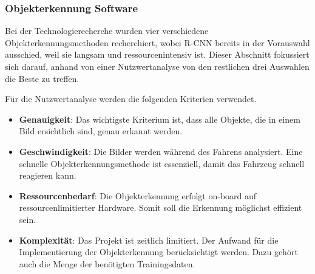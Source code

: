 \documentclass[../main.tex]{subfiles}
\begin{document}
\newpage

\subsubsection{Objekterkennung Software}
\label{a3:Objekterkennung}
Bei der Technologierecherche wurden vier verschiedene Objekterkennungsmethoden recherchiert, wobei R-CNN bereits in der Vorauswahl ausschied, weil sie langsam und ressourcenintensiv ist.
Dieser Abschnitt fokussiert sich darauf, anhand von einer Nutzwertanalyse von den restlichen drei Auswahlen die Beste zu treffen.

Für die Nutzwertanalyse werden die folgenden Kriterien verwendet.

\begin{itemize}
\item \textbf{Genauigkeit}: Das wichtigste Kriterium ist, dass alle Objekte, die in einem Bild ersichtlich sind, genau erkannt werden.
\item \textbf{Geschwindigkeit}: Die Bilder werden während des Fahrens analysiert. Eine schnelle Objekterkennungsmethode ist essenziell, damit das Fahrzeug schnell reagieren kann.
\item \textbf{Ressourcenbedarf}: Die Objekterkennung erfolgt on-board auf ressourcenlimitierter Hardware. Somit soll die Erkennung möglichst effizient sein.
\item \textbf{Komplexität}: Das Projekt ist zeitlich limitiert. Der Aufwand für die Implementierung der Objekterkennung berücksichtigt werden. Dazu gehört auch die Menge der benötigten Trainingsdaten.
\end{itemize}
\end{document}
